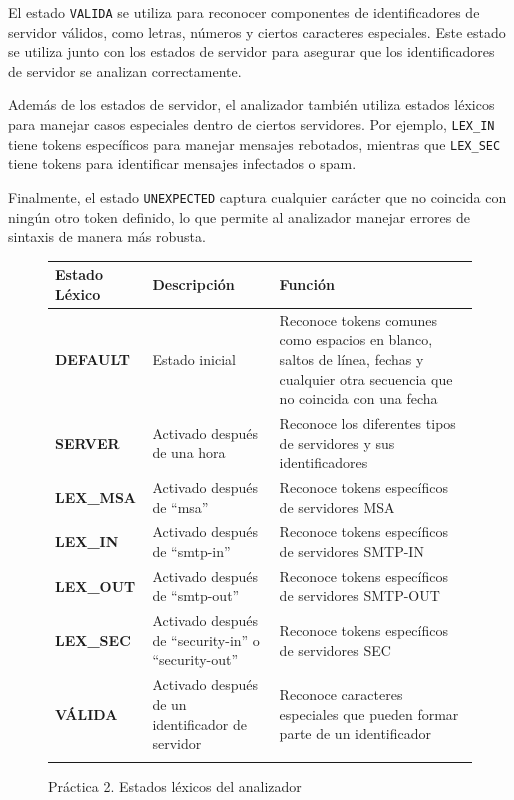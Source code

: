 El estado \lstinline|VALIDA| se utiliza para reconocer componentes de identificadores de servidor válidos, como letras, números y ciertos caracteres especiales. Este estado se utiliza junto con los estados de servidor para asegurar que los identificadores de servidor se analizan correctamente.

Además de los estados de servidor, el analizador también utiliza estados léxicos para manejar casos especiales dentro de ciertos servidores. Por ejemplo, \lstinline|LEX_IN| tiene tokens específicos para manejar mensajes rebotados, mientras que \lstinline|LEX_SEC| tiene tokens para identificar mensajes infectados o spam.

Finalmente, el estado \lstinline|UNEXPECTED| captura cualquier carácter que no coincida con ningún otro token definido, lo que permite al analizador manejar errores de sintaxis de manera más robusta.

\begin{figure}[H]
  \centering
  \begin{tabularx}{\textwidth}{>{\bfseries}l X X}
  \toprule
  \textbf{Estado Léxico} & \textbf{Descripción} & \textbf{Función} \\
  \midrule
  DEFAULT & Estado inicial & Reconoce tokens comunes como espacios en blanco, saltos de línea, fechas y cualquier otra secuencia que no coincida con una fecha \\
  \midrule
  SERVER & Activado después de una hora & Reconoce los diferentes tipos de servidores y sus identificadores \\
  \midrule
  LEX\_MSA & Activado después de ``msa'' & Reconoce tokens específicos de servidores MSA\\
  \midrule
  LEX\_IN & Activado después de ``smtp-in''& Reconoce tokens específicos de servidores SMTP-IN \\
  \midrule
  LEX\_OUT & Activado después de ``smtp-out''& Reconoce tokens específicos de servidores SMTP-OUT \\
  \midrule
  LEX\_SEC & Activado después de ``security-in'' o ``security-out'' & Reconoce tokens específicos de servidores SEC \\
  \midrule
  VÁLIDA & Activado después de un identificador de servidor & Reconoce caracteres especiales que pueden formar parte de un identificador \\
  \\
  \bottomrule
  \end{tabularx}
  \caption{\label{fig:tablaestadoslexicosp2}Práctica 2. Estados léxicos del analizador}
  \label{table:lexical_states}
  \end{figure}

